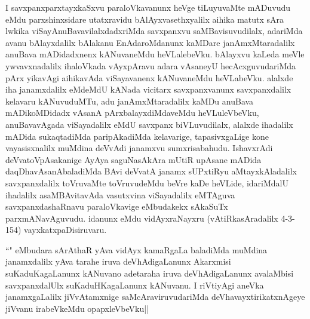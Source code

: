 \begin{artha}
I savxpanxparxtayxkaSxvu paraloVkavanunx heVge tiLuyuvaMte mADuvudu eMdu parxshinxsidare utatxravidu bAlAyxvasethxyalilx aihika matutx sAra lwkika viSayAnuBavavilalxdadxriMda savxpanxvu saMBavisuvudilalx, adariMda avanu bAlayxdalilx bAlakanu EnAdaroMdanunx kaMDare janAmxMtaradalilx anuBava mADidadxnenx kANuvaneMdu heVLalebeVku. bAlayxvu kaLeda meVle ywvavxnadalilx ihaloVkada vAyxpAravu adara vAsaneyU hecAcxguvudariMda pArx yikavAgi aihikavAda viSayavanenx kANuvaneMdu heVLabeVku. alalxde iha janamxdalilx eMdeMdU kANada vicitarx savxpanxvanunx savxpanxdalilx kelavaru kANuvuduMTu, adu janAmxMtaradalilx kaMDu anuBava mADikoMDidadx vAsanA pArxbalayxdiMdaveMdu heVLuleVbeVku, anuBavavAgada viSayadalilx eMdU savxpanx biVLuvudilalx, alalxde ihadalilx mADida sukaqtadiMda paripAkadiMda kelavarige, tapasivxgaLige kone vayasisxnalilx muMdina deVvAdi janamxvu sumxrisabahudu. IshavxrAdi deVvatoVpAsakanige AyAya saguNasAkAra mUtiR upAsane mADida daqDhavAsanAbaladiMda BAvi deVvatA janamx sUPxtiRyu aMtayxkAladalilx savxpanxdalilx toVruvaMte toVruvudeMdu beVre kaDe heVLide, idariMdalU ihadalilx asaMBAvitavAda vasutxvina viSayadalilx eMTAguva savxpanxdashaRnavu paraloVkavige eMbudakekx sAkaSuTx parxmANavAguvudu. idanunx \stext eMdu vidAyxraNayxru (vAtiRkasAradalilx 4-3-154) vayxkatxpaDisiruvaru.
\end{artha}%


\begin{artha}
``\stext " eMbudara sArAthaR yAva vidAyx kamaRgaLa baladiMda muMdina janamxdalilx yAva tarahe iruva deVhAdigaLanunx Akarxmisi suKaduKagaLanunx kANuvano adetaraha iruva deVhAdigaLanunx avalaMbisi savxpanxdalUlx suKaduHKagaLanunx kANuvanu. I riVtiyAgi aneVka janamxgaLalilx jiVvAtamxnige saMcAraviruvudariMda deVhavayxtirikatxnAgeye jiVvanu irabeVkeMdu opapxleVbeVku||
\end{artha}


